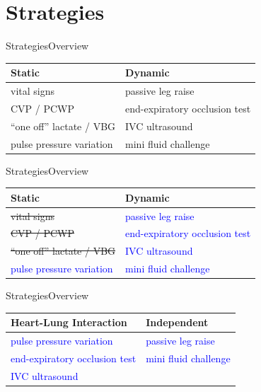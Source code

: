 \documentclass{beamer}
\newcommand{\pro}{\textcolor{blue}}
\begin{document}
	\section{Strategies}
			\begin{frame}{Strategies}{Overview}
				\begin{center}
					\begin{tabular}{l||l}
						\textbf{Static} & \textbf{Dynamic} \\	
						\hline
						\pause
						vital signs & passive leg raise\\
						\hline
						CVP / PCWP & end-expiratory occlusion test\\
						\hline
						``one off'' lactate / VBG & IVC ultrasound\\
						\hline
						pulse pressure variation & mini fluid challenge\\
					\end{tabular}
				\end{center}
			\end{frame}
			\begin{frame}{Strategies}{Overview}
				\begin{center}
					\begin{tabular}{l||l}
						\textbf{Static} & \textbf{Dynamic} \\	
						\hline
						\sout{vital signs} & \pro{passive leg raise}\\
						\hline
						\sout{CVP / PCWP} & \pro{end-expiratory occlusion test}\\
						\hline
						\sout{``one off'' lactate / VBG} & \pro{IVC ultrasound}\\
						\hline
						\pro{pulse pressure variation} & \pro{mini fluid challenge}\\
					\end{tabular}
				\end{center}
			\end{frame}
			\begin{frame}{Strategies}{Overview}
				\begin{center}
					\begin{tabular}{l||l}
						\textbf{Heart-Lung Interaction} & \textbf{Independent} \\	
						\hline
						\pro{pulse pressure variation} & \pro{passive leg raise}\\
						\hline
						\pro{end-expiratory occlusion test} & \pro{mini fluid challenge}\\
						\hline
						\pro{IVC ultrasound} & \\
					\end{tabular}
				\end{center}
			\end{frame}
\end{document}

